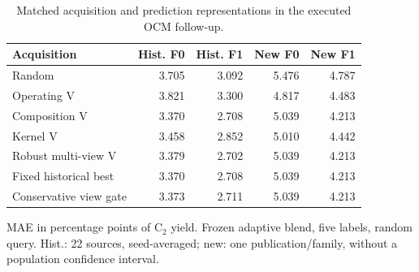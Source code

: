 \begin{table}[htbp]\centering\small
\caption{Matched acquisition and prediction representations in the executed OCM follow-up.}\label{tab:step9matched}
\begin{tabular}{lrrrr}\toprule
Acquisition & Hist. F0 & Hist. F1 & New F0 & New F1 \\ \midrule
Random & 3.705 & 3.092 & 5.476 & 4.787 \\
Operating V & 3.821 & 3.300 & 4.817 & 4.483 \\
Composition V & 3.370 & 2.708 & 5.039 & 4.213 \\
Kernel V & 3.458 & 2.852 & 5.010 & 4.442 \\
Robust multi-view V & 3.379 & 2.702 & 5.039 & 4.213 \\
Fixed historical best & 3.370 & 2.708 & 5.039 & 4.213 \\
Conservative view gate & 3.373 & 2.711 & 5.039 & 4.213 \\
\bottomrule\end{tabular}
\par\smallskip\footnotesize MAE in percentage points of C$_2$ yield. Frozen adaptive blend, five labels, random query. Hist.: 22 sources, seed-averaged; new: one publication/family, without a population confidence interval.
\end{table}
